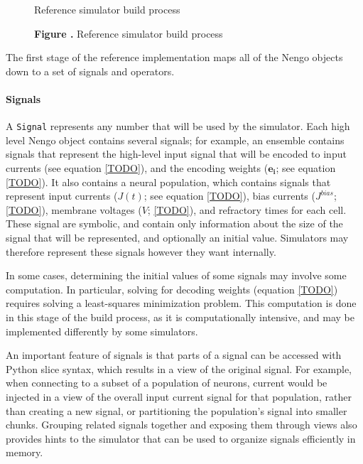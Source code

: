 \documentclass{frontiersSCNS}
\begin{document}
\begin{figure}
\begin{center}
  Reference simulator build process
\end{center}
 \textbf{\label{fig:01} Figure .}{
   Reference simulator build process}
\end{figure}

The first stage of the reference implementation
maps all of the Nengo objects
down to a set of signals and operators.

\paragraph{Signals}
A \texttt{Signal} represents any number that
will be used by the simulator.
Each high level Nengo object contains
several signals;
for example, an ensemble contains signals
that represent the high-level input
signal that will be encoded
to input currents (see equation \eqref{TODO}),
and the encoding weights
($\mathbf{e_i}$; see equation \eqref{TODO}).
It also contains a neural population,
which contains signals that represent
input currents
($J(t)$; see equation \eqref{TODO}),
bias currents ($J^{bias}$; \eqref{TODO}),
membrane voltages ($V$; \eqref{TODO}),
and refractory times for each cell.
These signal are symbolic,
and contain only information
about the size of the signal that will be represented,
and optionally an initial value.
Simulators may therefore represent
these signals however they want internally.

In some cases, determining
the initial values of some signals
may involve some computation.
In particular, solving for decoding weights
(equation \eqref{TODO}) requires
solving a least-squares minimization problem.
This computation is done in this stage
of the build process,
as it is computationally intensive,
and may be implemented
differently by some simulators.

An important feature of signals
is that parts of a signal
can be accessed with Python slice syntax,
which results in a view of the original signal.
For example, when connecting to
a subset of a population of neurons,
current would be injected
in a view of the overall input current signal
for that population,
rather than creating a new signal,
or partitioning the population's signal
into smaller chunks.
Grouping related signals together
and exposing them through views
also provides hints to the simulator
that can be used to organize signals
efficiently in memory.
\end{document}
